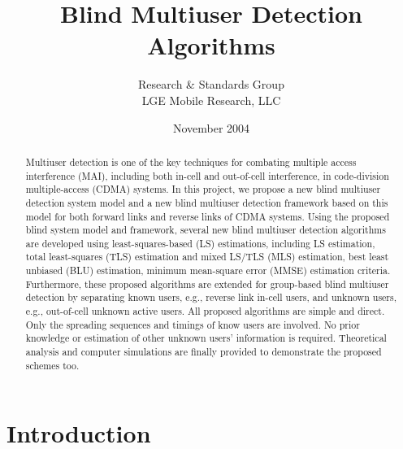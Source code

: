 \documentclass[a4paper,11pt,fleqn]{article}
\title{Blind Multiuser Detection Algorithms}
\author{Research \& Standards Group\\ LGE Mobile Research, LLC}
\date{November 2004}
\begin{document}
\maketitle

\pagebreak

\tableofcontents

\pagebreak

\listoffigures

\pagebreak


\begin{abstract}
Multiuser detection is one of the key techniques for combating
multiple access interference (MAI), including both in-cell and
out-of-cell interference, in code-division multiple-access (CDMA)
systems. In this project, we propose a new blind multiuser
detection system model and a new blind multiuser detection
framework based on this model for both forward links and reverse
links of CDMA systems. Using the proposed blind system model and
framework, several new blind multiuser detection algorithms are
developed using least-squares-based (LS) estimations, including LS
estimation, total least-squares (TLS) estimation and mixed LS/TLS
(MLS) estimation, best least unbiased (BLU) estimation, minimum
mean-square error (MMSE) estimation criteria. Furthermore, these
proposed algorithms are extended for group-based blind multiuser
detection by separating known users, e.g., reverse link in-cell
users, and unknown users, e.g., out-of-cell unknown active users.
All proposed algorithms are simple and direct. Only the spreading
sequences and timings of know users are involved. No prior
knowledge or estimation of other unknown users' information is
required. Theoretical analysis and computer simulations are
finally provided to demonstrate the proposed schemes too.
\end{abstract}

\pagebreak

\section{Introduction}
\end{document}
